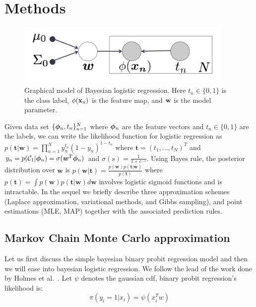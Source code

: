 \section{Methods}

\begin{figure}[t]
\centering
\includegraphics[height=3.0cm]{BLR_graphical.png}

\caption{\small Graphical model of Bayesian logistic regression. Here
$t_n \in \{0,1\}$ is the class label, $\phi({\bf x}_n)$ is the feature map,
and ${\bf w}$ is the model parameter.}

\label{fig:BLR_graphical}
\end{figure}

Given data set $\{\bm{\phi}_n, t_n\}_{n=1}^N$ where $\bm{\phi}_n$ are the feature
vectors and $t_n\in \{0,1\}$ are the labels, we can write the likelihood
function for logistic regression as $p(\bm{t}|\bm{w}) = \prod_{n=1}^N
y_n^{t_n} (1-y_n)^{1-t_n}$ where $\bm{t} = (t_1,...,t_N)^T$ and
$y_n=p(\mathcal{C}_1|\bm{\phi}_n) = \sigma(\bm{w}^T \bm{\phi}_n)$ and $\sigma(s) =
\frac{1}{1+e^{-s}}$. Using Bayes rule, the posterior distribution over
$\bm{w}$ is $p(\bm{w}|\bm{t}) = \frac{p(\bm{w}) p(\bm{t}|\bm{w})}{p(\bm{t})}$
where $p(\bm{t}) = \int p(\bm{w})p(\bm{t}|\bm{w}) d\bm{w}$ involves logistic
sigmoid functions and is intractable. In the sequel we briefly describe three
approximation schemes (Laplace approximation, variational methods, and Gibbs
sampling), and point estimations (MLE, MAP) together with the associated
prediction rules.

\subsection{Markov Chain Monte Carlo approximation}
\label{sec:MCMCmethod}
Let us first discuss the simple bayesian binary probit regression model and 
then we will ease into bayesian logistic regression. We follow the lead of
the work done by Holmes et al.~\cite{Holmes}. Let $\psi$ denotes the gaussian
cdf, binary probit regression's likelihood is:
\begin{equation}
\pi(y_i=1|x_i) = \psi(x_i^Tw)
\end{equation}

